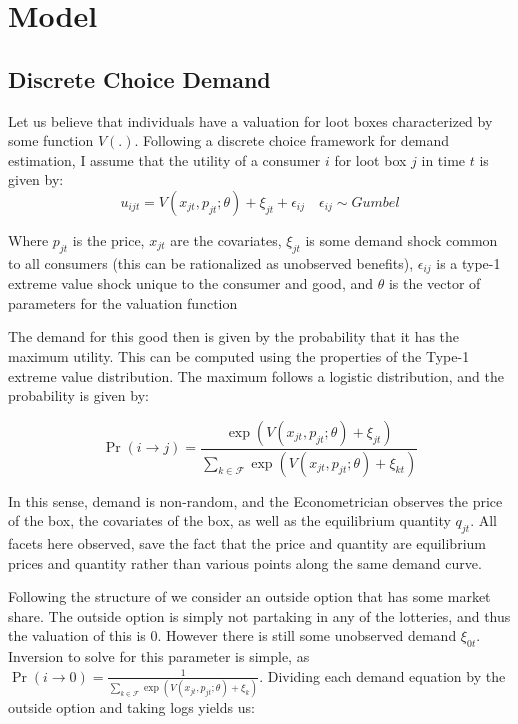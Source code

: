 \documentclass[12pt]{paper}
\begin{document}
\section{Model}



\subsection{Discrete Choice Demand}

Let us believe that individuals have a valuation for loot boxes
characterized by some function $V(.)$. Following a discrete choice
framework for demand estimation, I assume that the utility of a
consumer $i$ for loot box $j$ in time $t$ is given by:
\begin{equation*}
  u_{ijt} = V( x_{jt}, p_{jt}; \theta ) + \xi_{jt} + \epsilon_{ij} \quad \epsilon_{ij} \sim Gumbel
\end{equation*}

Where $p_{jt}$ is the price, $x_{jt}$ are the covariates, $\xi_{jt}$ is
some demand shock common to all consumers (this can be rationalized as
unobserved benefits), $\epsilon_{ij}$ is a type-1 extreme value shock unique
to the consumer and good, and $\theta$ is the vector of parameters for the
valuation function

The demand for this good then is given by the probability that it has
the maximum utility. This can be computed using the properties of the
Type-1 extreme value distribution. The maximum follows a logistic
distribution, and the probability is given by:

\begin{equation*}
  \Pr( i \rightarrow j ) = \frac{\exp( V(x_{jt},p_{jt} ; \theta) + \xi_{jt})}{ \sum_{k \in \mathcal{F}}
    \exp(V(x_{jt},p_{jt}; \theta) + \xi_{kt})}
\end{equation*}

In this sense, demand is non-random, and the Econometrician observes
the price of the box, the covariates of the box, as well as the
equilibrium quantity $q_{jt}$. All facets here observed, save the fact
that the price and quantity are equilibrium prices and quantity rather
than various points along the same demand curve.

Following the structure of \cite{Berry1994} we consider an outside option
that has some market share. The outside option is simply not partaking
in any of the lotteries, and thus the valuation of this is $0$.
However there is still some unobserved demand $\xi_{0t}$. Inversion to
solve for this parameter is simple, as
$\Pr( i \rightarrow 0) = \frac{1}{ \sum_{k \in \mathcal{F}} \exp(V(x_{jt},p_{jt}; \theta) +
  \xi_k)}$.  Dividing each demand equation by the outside option and
taking logs yields us:
\end{document}
